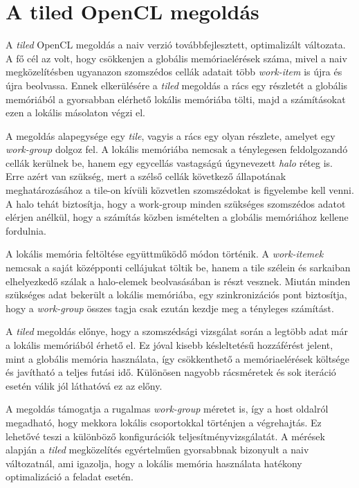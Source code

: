 \documentclass[12pt,a4paper]{article}
\begin{document}
\section{A tiled OpenCL megoldás}

A \emph{tiled} OpenCL megoldás a naiv verzió továbbfejlesztett, optimalizált változata. A fő cél az volt, hogy csökkenjen a globális memóriaelérések száma, mivel a naiv megközelítésben ugyanazon szomszédos cellák adatait több \emph{work-item} is újra és újra beolvassa. Ennek elkerülésére a \emph{tiled} megoldás a rács egy részletét a globális memóriából a gyorsabban elérhető lokális memóriába tölti, majd a számításokat ezen a lokális másolaton végzi el.

A megoldás alapegysége egy \emph{tile}, vagyis a rács egy olyan részlete, amelyet egy \emph{work-group} dolgoz fel. A lokális memóriába nemcsak a ténylegesen feldolgozandó cellák kerülnek be, hanem egy egycellás vastagságú úgynevezett \emph{halo} réteg is. Erre azért van szükség, mert a szélső cellák következő állapotának meghatározásához a tile-on kívüli közvetlen szomszédokat is figyelembe kell venni. A halo tehát biztosítja, hogy a work-group minden szükséges szomszédos adatot elérjen anélkül, hogy a számítás közben ismételten a globális memóriához kellene fordulnia.

A lokális memória feltöltése együttműködő módon történik. A \emph{work-itemek} nemcsak a saját középponti cellájukat töltik be, hanem a tile szélein és sarkaiban elhelyezkedő szálak a halo-elemek beolvasásában is részt vesznek. Miután minden szükséges adat bekerült a lokális memóriába, egy szinkronizációs pont biztosítja, hogy a \emph{work-group} összes tagja csak ezután kezdje meg a tényleges számítást.

A \emph{tiled} megoldás előnye, hogy a szomszédsági vizsgálat során a legtöbb adat már a lokális memóriából érhető el. Ez jóval kisebb késleltetésű hozzáférést jelent, mint a globális memória használata, így csökkenthető a memóriaelérések költsége és javítható a teljes futási idő. Különösen nagyobb rácsméretek és sok iteráció esetén válik jól láthatóvá ez az előny.

A megoldás támogatja a rugalmas \emph{work-group} méretet is, így a host oldalról megadható, hogy mekkora lokális csoportokkal történjen a végrehajtás. Ez lehetővé teszi a különböző konfigurációk teljesítményvizsgálatát. A mérések alapján a \emph{tiled} megközelítés egyértelműen gyorsabbnak bizonyult a naiv változatnál, ami igazolja, hogy a lokális memória használata hatékony optimalizáció a feladat esetén.
\end{document}
